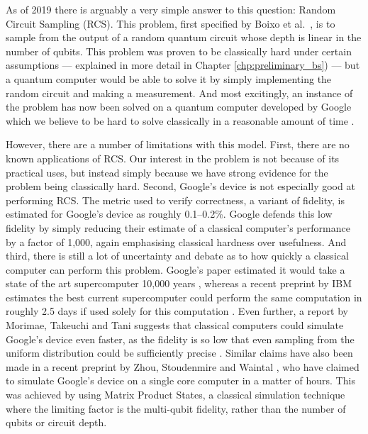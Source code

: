 As of 2019 there is arguably a very simple answer to this question: Random Circuit Sampling (RCS). This problem, first specified by Boixo et al.~\cite{boixo2018}, is to sample from the output of a random quantum circuit whose depth is linear in the number of qubits. This problem was proven to be classically hard under certain assumptions \cite{hangleiter2018, bouland2018} --- explained in more detail in Chapter \ref{chp:preliminary_bs}) --- but a quantum computer would be able to solve it by simply implementing the random circuit and making a measurement. And most excitingly, an instance of the problem has now been solved on a quantum computer developed by Google which we believe to be hard to solve classically in a reasonable amount of time \cite{arute2019}.

However, there are a number of limitations with this model. First, there are no known applications of RCS. Our interest in the problem is not because of its practical uses, but instead simply because we have strong evidence for the problem being classically hard. Second, Google's device is not especially good at performing RCS. The metric used to verify correctness, a variant of fidelity, is estimated for Google's device as roughly 0.1--0.2\%. Google defends this low fidelity by simply reducing their estimate of a classical computer's performance by a factor of 1,000, again emphasising classical hardness over usefulness. And third, there is still a lot of uncertainty and debate as to how quickly a classical computer can perform this problem. Google's paper estimated it would take a state of the art supercomputer 10,000 years \cite{arute2019}, whereas a recent preprint by IBM estimates the best current supercomputer could perform the same computation in roughly 2.5 days if used solely for this computation \cite{pednault2019}. Even further, a report by Morimae, Takeuchi and Tani suggests that classical computers could simulate Google's device even faster, as the fidelity is so low that even sampling from the uniform distribution could be sufficiently precise \cite{morimae2019google}. Similar claims have also been made in a recent preprint by Zhou, Stoudenmire and Waintal \cite{zhou2020}, who have claimed to simulate Google's device on a single core computer in a matter of hours. This was achieved by using Matrix Product States, a classical simulation technique where the limiting factor is the multi-qubit fidelity, rather than the number of qubits or circuit depth.

